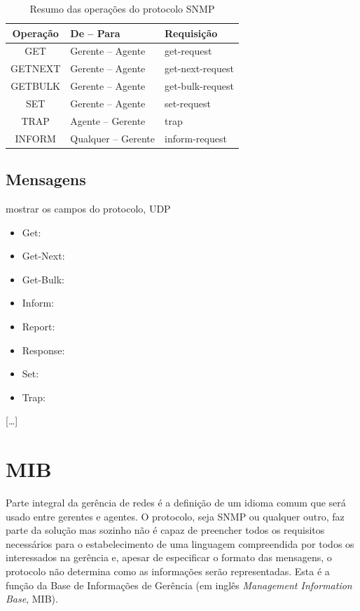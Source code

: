 \documentclass[twoside,english,brazilian]{UNISINOSmonografia}
\begin{document}
\begin{table}
	\centering
	\caption{Resumo das operações do protocolo SNMP}
	\label{tab:operacoesSNMP}
	\begin{minipage}{.60\textwidth}
		\begin{tabulary}{\textwidth}{|C|L|L|}
	\hline
		\textbf{Operação}   &  
		\textbf{De -- Para} & 
		\textbf{Requisição} \\ 
	\hline
		GET     & Gerente -- Agente   & get-request      \\
		GETNEXT & Gerente -- Agente   & get-next-request \\
		GETBULK & Gerente -- Agente   & get-bulk-request \\
		SET     & Gerente -- Agente   & set-request      \\
		TRAP    & Agente -- Gerente   & trap             \\
		INFORM  & Qualquer -- Gerente & inform-request   \\ 
	\hline
		\end{tabulary}
	\end{minipage}
\end{table}

\subsection{Mensagens}
mostrar os campos do protocolo, UDP

\begin{itemize}

\item Get:
\item Get-Next:
\item Get-Bulk:
\item Inform:
\item Report:
\item Response:
\item Set:
\item Trap:
\end{itemize}

[\dots]


\section{MIB}

Parte integral da gerência de redes é a definição de um idioma comum que será 
usado entre gerentes e agentes. O protocolo, seja SNMP ou qualquer outro, faz 
parte da solução mas sozinho não é capaz de preencher todos os requisitos 
necessários para o estabelecimento de uma linguagem compreendida por todos os 
interessados na gerência e, apesar de especificar o formato das mensagens, o 
protocolo não determina como as informações serão representadas.
Esta é a função da Base de Informações de Gerência 
(em inglês \textit{Management Information Base}, MIB).
\end{document}
